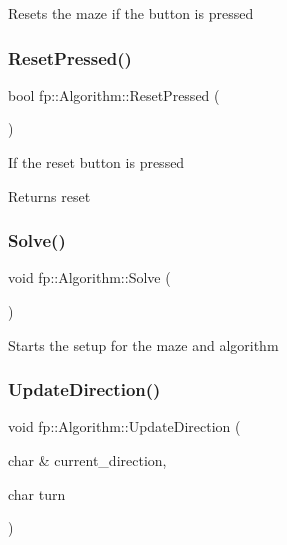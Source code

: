 Resets the maze if the button is pressed \mbox{\label{classfp_1_1_algorithm_a169e9e4e400a85687aa6554a3cbd2e04}} 
\subsubsection{\texorpdfstring{Reset\+Pressed()}{ResetPressed()}}
{\footnotesize\ttfamily bool fp\+::\+Algorithm\+::\+Reset\+Pressed (\begin{DoxyParamCaption}{ }\end{DoxyParamCaption})}

If the reset button is pressed \begin{DoxyReturn}{Returns}
reset 
\end{DoxyReturn}
\mbox{\label{classfp_1_1_algorithm_ac6e4cae1f140d0155f2feaaaf1d287c1}} 
\subsubsection{\texorpdfstring{Solve()}{Solve()}}
{\footnotesize\ttfamily void fp\+::\+Algorithm\+::\+Solve (\begin{DoxyParamCaption}{ }\end{DoxyParamCaption})}

Starts the setup for the maze and algorithm \mbox{\label{classfp_1_1_algorithm_ab91291b423ce58ba86e317112ca0c5ba}} 
\subsubsection{\texorpdfstring{Update\+Direction()}{UpdateDirection()}}
{\footnotesize\ttfamily void fp\+::\+Algorithm\+::\+Update\+Direction (\begin{DoxyParamCaption}\item[{char \&}]{current\+\_\+direction,  }\item[{char}]{turn }\end{DoxyParamCaption})}

